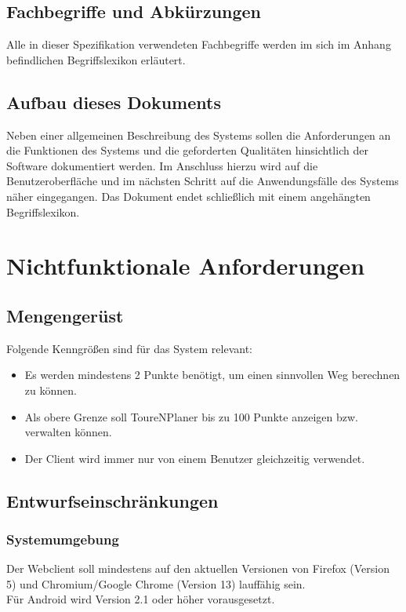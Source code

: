 \documentclass[a4paper,10pt,titlepage]{article}
\begin{document}
\subsection{Fachbegriffe und Abkürzungen}

Alle in dieser Spezifikation verwendeten Fachbegriffe werden im sich im Anhang befindlichen Begriffslexikon erläutert.

\subsection{Aufbau dieses Dokuments}

Neben einer allgemeinen Beschreibung des Systems sollen die Anforderungen an die Funktionen des Systems und die geforderten Qualitäten hinsichtlich der Software dokumentiert werden. 
Im Anschluss hierzu wird auf die Benutzeroberfläche und im nächsten Schritt auf die Anwendungsfälle des Systems näher eingegangen. 
Das Dokument endet schließlich mit einem angehängten Begriffslexikon.

\section{Nichtfunktionale Anforderungen}

\subsection{Mengengerüst} \label{Mengengeruest}

Folgende Kenngrößen sind für das System relevant:
\begin{itemize}
\item Es werden mindestens 2 Punkte benötigt, um einen sinnvollen Weg berechnen zu können.
\item Als obere Grenze soll ToureNPlaner bis zu 100 Punkte anzeigen bzw. verwalten können.
\item Der Client wird immer nur von einem Benutzer gleichzeitig verwendet.
\end{itemize}

\subsection{Entwurfseinschränkungen}

\subsubsection{Systemumgebung}
Der Webclient soll mindestens auf den aktuellen Versionen von Firefox (Version 5) und Chromium/Google Chrome (Version 13) lauffähig sein.\\
Für Android wird Version 2.1 oder höher vorausgesetzt.
\end{document}
